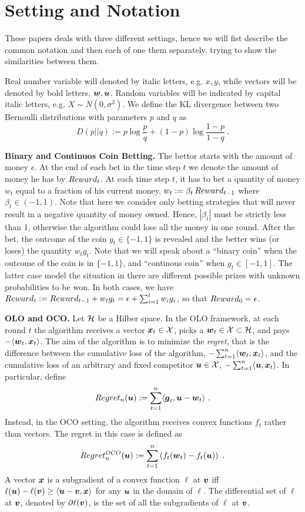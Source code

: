\section{Setting and Notation}
These papers deals with three different settings, hence we will fist describe the common notation and then each of one them separately, trying to show the similarities between them.

Real number variable will denoted by italic letters, e.g. $x,y$, while vectors will be denoted by bold letters, $\boldsymbol{w},\boldsymbol{u}$.
Random variables will be indicated by capital italic letters, e.g. $X \sim N(0,\sigma^2)$.
We define the KL divergence between two Bernoulli distributions with parameters $p$ and $q$ as
\[
D(p||q) := p \log\frac{p}{q} + (1-p) \log\frac{1-p}{1-q}~.
\]

\vspace{0.2cm}\noindent\textbf{Binary and Continuos Coin Betting.}
The bettor starts with the amount of money $\epsilon$. 
At the end of each bet in the time step $t$ we denote the amount of money he has by $Reward_t$.
At each time step $t$, it has to bet a quantity of money $w_t$ equal to a fraction of his current money, $w_t:=\beta_t \, Reward_{t-1}$ where $\beta_t \in (-1,1)$. Note that here we consider only betting strategies that will never result in a negative quantity of money owned. Hence, $|\beta_t|$ must be strictly less than 1, otherwise the algorithm could lose all the money in one round.
After the bet, the outcome of the coin $g_t \in \{-1,1\}$ is revealed and the better wins (or loses) the quantity $w_t g_t$.
Note that we will speak about a ``binary coin'' when the outcome of the coin is in $\{-1,1\}$, and ``continous coin'' when $g_t \in [-1,1]$. The latter case model the situation in there are different possible prizes with unknown probabilities to be won. In both cases, we have $Reward_t:=Reward_{t-1} + w_t g_t = \epsilon + \sum_{i=1}^t w_i g_i$, so that $Reward_0=\epsilon$.

\vspace{0.2cm}\noindent\textbf{\ac{OLO} and \ac{OCO}.}
Let $\mathcal{H}$ be a Hilber space. In the \ac{OLO} framework, at each round $t$ the algorithm receives a vector $\boldsymbol{x}_t \in \mathcal{X}$, picks a $\boldsymbol{w}_t \in \mathcal{X} \subset \mathcal{H}$, and pays $-\langle \boldsymbol{w}_t,\boldsymbol{x}_t \rangle$.
The aim of the algorithm is to minimize the \emph{regret}, that is the difference between the cumulative loss of the algorithm, $-\sum_{t=1}^n \langle \boldsymbol{w}_t,\boldsymbol{x}_t \rangle$, and the cumulative loss of an arbitrary and fixed competitor $\boldsymbol{u} \in \mathcal{X}$, $-\sum_{t=1}^n \langle \boldsymbol{u},\boldsymbol{x}_t \rangle$.
In particular, define
\[
Regret_n(\boldsymbol{u}) := \sum_{t=1}^n \langle \boldsymbol{g}_t , \boldsymbol{u} - \boldsymbol{w}_t \rangle~.
\]
Instead, in the \ac{OCO} setting, the algorithm receives convex functions $f_t$ rather than vectors.
The regret in this case is defined as
\[
Regret^{OCO}_n(\boldsymbol{u}) := \sum_{t=1}^n \left(f_t(\boldsymbol{w}_t) -f_t(\boldsymbol{u})\right)~.
\]
A vector $\boldsymbol{x}$ is a subgradient of a convex function $\ell$ at $\boldsymbol{v}$ iff $\ell(\boldsymbol{u}) - \ell(\boldsymbol{v}) \ge \langle \boldsymbol{u} - \boldsymbol{v}, \boldsymbol{x} \rangle$ for any $\boldsymbol{u}$ in the domain of $\ell$. The differential set of $\ell$ at $\boldsymbol{v}$, denoted by $\partial \ell(\boldsymbol{v})$, is the set of all the subgradients of $\ell$ at $\boldsymbol{v}$.

